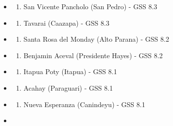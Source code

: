 \begin{itemize}
  \begin{enumerate}
  \def\labelenumi{\arabic{enumi}.}
  \setcounter{enumi}{7}
  \tightlist
  \item
    Yaguarun (Paraguari) - GSS 8.5
  \end{enumerate}
\item
  \begin{enumerate}
  \def\labelenumi{\arabic{enumi}.}
  \setcounter{enumi}{8}
  \tightlist
  \item
    San Vicente Pancholo (San Pedro) - GSS 8.3
  \end{enumerate}
\item
  \begin{enumerate}
  \def\labelenumi{\arabic{enumi}.}
  \setcounter{enumi}{9}
  \tightlist
  \item
    Tavarai (Caazapa) - GSS 8.3
  \end{enumerate}
\item
  \begin{enumerate}
  \def\labelenumi{\arabic{enumi}.}
  \setcounter{enumi}{10}
  \tightlist
  \item
    Santa Rosa del Monday (Alto Parana) - GSS 8.2
  \end{enumerate}
\item
  \begin{enumerate}
  \def\labelenumi{\arabic{enumi}.}
  \setcounter{enumi}{11}
  \tightlist
  \item
    Benjamin Aceval (Presidente Hayes) - GSS 8.2
  \end{enumerate}
\item
  \begin{enumerate}
  \def\labelenumi{\arabic{enumi}.}
  \setcounter{enumi}{12}
  \tightlist
  \item
    Itapua Poty (Itapua) - GSS 8.1
  \end{enumerate}
\item
  \begin{enumerate}
  \def\labelenumi{\arabic{enumi}.}
  \setcounter{enumi}{13}
  \tightlist
  \item
    Acahay (Paraguari) - GSS 8.1
  \end{enumerate}
\item
  \begin{enumerate}
  \def\labelenumi{\arabic{enumi}.}
  \setcounter{enumi}{14}
  \tightlist
  \item
    Nueva Esperanza (Canindeyu) - GSS 8.1
  \end{enumerate}
\item

\end{itemize}
